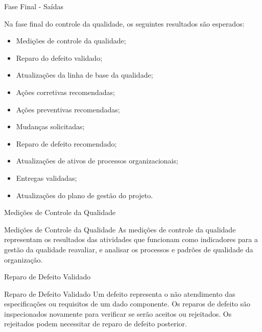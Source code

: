 \documentclass[xcolor=x11names,compress]{beamer}
\begin{document}
\begin{frame}[allowframebreaks]{Fase Final - Saídas}

Na fase final do controle da qualidade, os seguintes resultados são esperados:

\begin{itemize}
\itemsep 5mm

\item Medições de controle da qualidade;

\item Reparo do defeito validado;

\item Atualizações da linha de base da qualidade;

\item Ações corretivas recomendadas;

\item Ações preventivas recomendadas;

\item Mudanças solicitadas;

\item Reparo de defeito recomendado;

\item Atualizações de ativos de processos organizacionais;

\item Entregas validadas;

\item Atualizações do plano de gestão do projeto.

\end{itemize}

\end{frame}

\begin{frame}{Medições de Controle da Qualidade}

\begin{alertblock}{Medições de Controle da Qualidade}
As medições de controle da qualidade representam os resultados das atividades que funcionam como indicadores para a gestão da qualidade reavaliar, e analisar os processos e padrões de qualidade da organização.
\end{alertblock}

\end{frame}

\begin{frame}{Reparo de Defeito Validado}

\begin{alertblock} {Reparo de Defeito Validado}
Um defeito representa o não atendimento das especificações ou requisitos de um dado componente. Os reparos de defeito são inspecionados novamente para verificar se serão aceitos ou rejeitados. Os rejeitados podem necessitar de reparo de defeito posterior.
\end{alertblock}

\end{frame}
\end{document}

